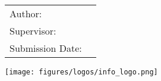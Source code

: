 \begin{titlepage}
\begin{center}
\begin{Large}
            \getDoctype%
        \end{Large}\\[1.5cm]
        \begin{Huge}
            \@title\par
        \end{Huge}
        \vspace{10mm}
        \begin{Huge}
            \texttt{\getTitleGer{}}
        \end{Huge}
        \vspace{10mm}
        \begin{tabular}{l l}
            Author:          & \getAuthor{} \\
            Supervisor:      & \getSupervisor{} \\
            Submission Date: & \getSubmissionDate{} \\
        \end{tabular}
        \vfill
        \texttt{[image: figures/logos/info\_logo.png]}\\
    \end{center}
    \makeatother
\end{titlepage}
